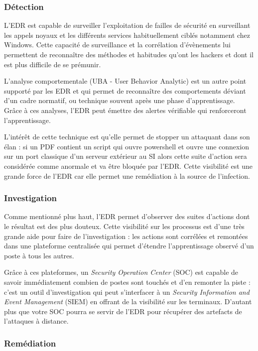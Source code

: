 \subsubsection{Détection}

L’EDR est capable de surveiller l’exploitation de failles de sécurité en surveillant les appels noyaux et les différents services habituellement ciblés notamment chez Windows. Cette capacité de surveillance et la corrélation d’évènements lui permettent de reconnaître des méthodes et habitudes qu’ont les hackers et dont il est plus difficile de se prémunir.

L’analyse comportementale (UBA - User Behavior Analytic) est un autre point supporté par les EDR et qui permet de reconnaître des comportements déviant d’un cadre normatif, ou technique souvent après une phase d’apprentissage. Grâce à ces analyses, l’EDR peut émettre des alertes vérifiable qui renforceront l’apprentissage. 

 L’intérêt de cette technique est qu’elle permet de stopper un attaquant dans son élan : si un PDF contient un script qui ouvre powershell et ouvre une connexion sur un port classique d’un serveur extérieur au SI alors cette suite d’action sera considérée comme anormale et va être bloquée par l’EDR. Cette visibilité est une grande force de l’EDR car elle permet une remédiation à la source de l’infection.


\subsubsection{Investigation}

Comme mentionné plus haut, l’EDR permet d’observer des suites d’actions dont le résultat est des plus douteux. Cette visibilité sur les processus est d’une très grande aide pour faire de l’investigation : les actions sont corrélées et remontées dans une plateforme centralisée qui permet d’étendre l’apprentissage observé d’un poste à tous les autres. 

Grâce à ces plateformes, un \textit{Security Operation Center} (SOC) est capable de savoir immédiatement combien de postes sont touchés et d’en remonter la piste : c’est un outil d’investigation qui peut s'interfacer à  un \textit{Security Information and Event Management} (SIEM) en offrant de la visibilité sur les terminaux. D’autant plus que votre SOC pourra se servir de l’EDR pour récupérer des artefacts de l’attaques à distance.

\subsubsection{Remédiation}

